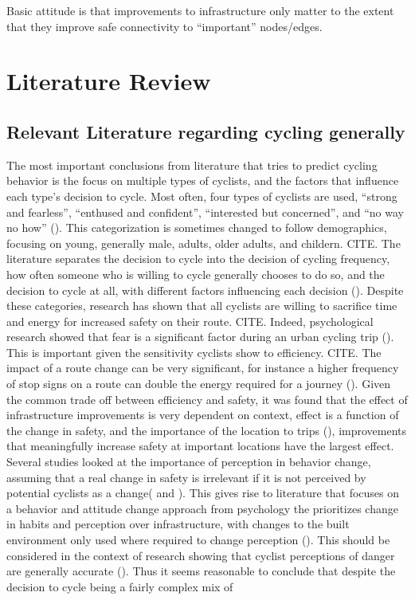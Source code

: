 \documentclass[11pt]{article} %
\begin{document}
Basic attitude is that improvements to infrastructure only matter to the extent that they improve safe connectivity to ``important'' nodes/edges. 


\section{Literature Review}

\subsection{Relevant Literature regarding cycling generally}

The most important conclusions from literature that tries to predict cycling behavior is the focus on multiple types of cyclists, and the factors that influence each type's decision to cycle. Most often, four types of cyclists are used, ``strong and fearless'', ``enthused and confident'', ``interested but concerned'', and ``no way no how'' (\cite{dill2013four}). This categorization is sometimes changed to follow demographics, focusing on young, generally male, adults, older adults, and childern. CITE. The literature separates the decision to cycle into the decision of cycling frequency, how often someone who is willing to cycle generally chooses to do so, and the decision to cycle at all, with different factors influencing each decision (\cite{stinson2005comparison}). Despite these categories, research has shown that all cyclists are willing to sacrifice time and energy for increased safety on their route. CITE. Indeed, psychological research showed that fear is a significant factor during an urban cycling trip (\cite{ellett2018state}). This is important given the sensitivity cyclists show to efficiency. CITE. The impact of a route change can be very significant, for instance a higher frequency of stop signs on a route can double the energy required for a journey (\cite{fajans2001bicyclists}). Given the common trade off between efficiency and safety, it was found that the effect of infrastructure improvements is very dependent on context, effect is a function of the change in safety, and the importance of the location to trips (\cite{kondo2018bike}), improvements that meaningfully increase safety at important locations have the largest effect. Several studies looked at the importance of perception in behavior change, assuming that a real change in safety is irrelevant if it is not perceived by potential cyclists as a change(\cite{li2012physical} and \cite{parkin2007models}). This gives rise to literature that focuses on a behavior and attitude change approach from psychology the prioritizes change in habits and perception over infrastructure, with changes to the built environment only used where required to change perception (\cite{savan2017integrated}). This should be considered in the context of research showing that cyclist perceptions of danger are generally accurate (\cite{vandenbulcke2014predicting}). Thus it seems reasonable to conclude that despite the decision to cycle being a fairly complex mix of 
\end{document}
